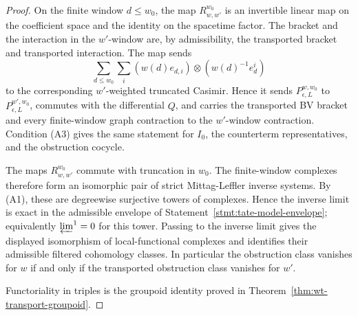 \begin{proof}
  On the finite window \(d\leq w_0\), the map \(R_{w,w'}^{w_0}\) is an
  invertible linear map on the coefficient space and the identity on
  the spacetime factor.  The bracket and the interaction in the
  \(w'\)-window are, by admissibility, the transported bracket and
  transported interaction.  The map sends
  \[
    \sum_{d\leq w_0}\sum_i
      (w(d)e_{d,i})\otimes(w(d)^{-1}e^i_d)
  \]
  to the corresponding \(w'\)-weighted truncated Casimir.  Hence it
  sends \(P_{\epsilon,L}^{w,w_0}\) to \(P_{\epsilon,L}^{w',w_0}\),
  commutes with the differential \(Q\), and carries the transported BV
  bracket and every finite-window graph contraction to the
  \(w'\)-window contraction.  Condition (A3) gives the same statement for
  \(I_0\), the counterterm representatives, and the obstruction
  cocycle.

  The maps \(R_{w,w'}^{w_0}\) commute with truncation in \(w_0\).  The
  finite-window complexes therefore form an isomorphic pair of strict
  Mittag-Leffler inverse systems.  By (A1), these are degreewise
  surjective towers of complexes.  Hence the inverse limit is exact in
  the admissible envelope of
  Statement~\ref{stmt:tate-model-envelope}; equivalently
  \(\varprojlim^1=0\) for this tower.  Passing to the inverse limit
  gives the displayed isomorphism of local-functional complexes and
  identifies their admissible filtered cohomology classes.  In
  particular the obstruction class vanishes for \(w\) if and only if
  the transported obstruction class vanishes for \(w'\).

  Functoriality in triples is the groupoid identity proved in
  Theorem~\ref{thm:wt-transport-groupoid}.
\end{proof}

